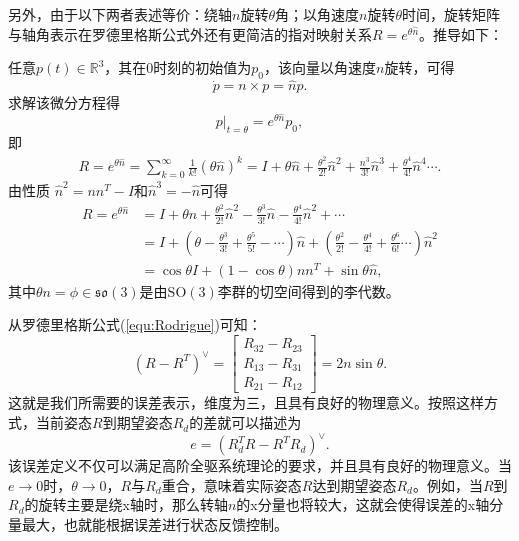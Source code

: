 另外，由于以下两者表述等价：绕轴$n$旋转$\theta$角；以角速度$n$旋转$\theta$时间，旋转矩阵与轴角表示在罗德里格斯公式外还有更简洁的指对映射关系$R=e^{\theta \widehat n}$。推导如下：

任意$p(t) \in \mathbb{R}^{3}$，其在0时刻的初始值为$p_0$，该向量以角速度$n$旋转，可得
$$\dot p=n \times p=\widehat n p.$$
求解该微分方程得
$$p|_{t=\theta}=e^{\theta \widehat n} p_0,$$
即$$\begin{aligned}R=e^{\theta \widehat n}=\sum_{k=0}^\infty \frac{1}{k!}(\theta \widehat n)^k
       =I+\theta \widehat n+\frac{\theta^2}{2 !} \widehat{n}^2+\frac{n^3}{3 !} \widehat{n}^3+\frac{\theta^4}{4 !} \widehat{n}^4\cdots .\end{aligned}      $$
由性质 $\widehat n^2=nn^T-I$和$\widehat n^3=-\widehat n$可得
$$\begin{aligned}R=e^{\theta \widehat n}&=
      I+\theta \widehat{n}+\frac{\theta^2}{2 !} \widehat{n}^2-\frac{\theta^3}{3 !} \widehat{n}-\frac{\theta^4}{4 !} \widehat{n}^2+\cdots \\
      & =I+\left(\theta-\frac{\theta^3}{3 !}+\frac{\theta^5}{5 !}-\cdots\right) \widehat{n}+\left(\frac{\theta^2}{2 !}-\frac{\theta^4}{4 !}+\frac{\theta^6}{6 !} \cdots\right) \widehat{n}^2 \\
      &=\cos \theta I+(1- \cos \theta)nn^T+\sin\theta \widehat n,
      \end{aligned}      $$
其中$\theta n=\phi \in \mathfrak{so}(3)$是由$\text{SO}(3)$李群的切空间得到的李代数\cite{Liegroup}。

从罗德里格斯公式(\ref{equ:Rodrigue})可知：
\begin{equation}
  (R-R^T)^\vee=\begin{bmatrix}
    R_{32}-R_{23} \\
    R_{13}-R_{31} \\
    R_{21}-R_{12}
    \end{bmatrix}=2 n \sin\theta.
    \label{error}
\end{equation}
这就是我们所需要的误差表示，维度为三，且具有良好的物理意义。按照这样方式，当前姿态$R$到期望姿态$R_d$的差就可以描述为
\begin{equation}
    e=(R_d^TR-R^TR_d)^\vee.
\end{equation}
该误差定义不仅可以满足高阶全驱系统理论的要求，并且具有良好的物理意义。当$e\to 0$时，$\theta \to 0$，$R$与$R_d$重合，意味着实际姿态$R$达到期望姿态$R_d$。例如，当$R$到$R_d$的旋转主要是绕x轴时，那么转轴$n$的x分量也将较大，这就会使得误差的x轴分量最大，也就能根据误差进行状态反馈控制。

